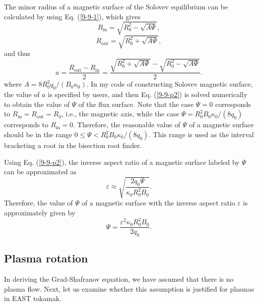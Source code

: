 \documentclass{article}
\newcommand{\tmop}[1]{\ensuremath{\operatorname{#1}}}
\begin{document}
The minor radius of a magnetic surface of the Solovev equilibrium can be
calculated by using Eq. (\ref{9-9-1}), which gives
\begin{equation}
  R_{\tmop{in}} = \sqrt{R_0^2 - \sqrt{A \Psi}},
\end{equation}
\begin{equation}
  R_{\tmop{out}} = \sqrt{R_0^2 + \sqrt{A \Psi}},
\end{equation}
and thus
\begin{equation}
  \label{9-9-p2} a = \frac{R_{\tmop{out}} - R_{\tmop{in}}}{2} =
  \frac{\sqrt{R_0^2 + \sqrt{A \Psi}} - \sqrt{R_0^2 - \sqrt{A \Psi}}}{2} .
\end{equation}
where $A = 8 R_0^2 q_0 / (B_0 \kappa_0)$. In my code of constructing Solovev
magnetic surface, the value of $a$ is specified by users, and then Eq.
(\ref{9-9-p2}) is solved numerically to obtain the value of $\Psi$ of the flux
surface. Note that the case $\Psi = 0$ corresponds to $R_{\tmop{in}} =
R_{\tmop{out}} = R_0$, i.e., the magnetic axis, while the case $\Psi = R_0^2
B_0 \kappa_0 / (8 q_0)$ corresponds to $R_{\tmop{in}} = 0$. Therefore, the
reasonable value of $\Psi$ of a magnetic surface should be in the range $0
\leqslant \Psi < R_0^2 B_0 \kappa_0 / (8 q_0)$. This range is used as the
interval bracketing a root in the bisection root finder.

Using Eq. (\ref{9-9-p2}), the inverse aspect ratio of a magnetic surface
labeled by $\Psi$ can be approximated as{\cite{jardin2010}}
\begin{equation}
  \varepsilon \approx \sqrt{\frac{2 q_0 \Psi}{\kappa_0 R_0^2 B_0}} .
\end{equation}
Therefore, the value of $\Psi$ of a magnetic surface with the inverse aspect
ratio $\varepsilon$ is approximately given by
\begin{equation}
  \Psi = \frac{\varepsilon^2 \kappa_0 R_0^2 B_0}{2 q_0} .
\end{equation}
\subsection{Plasma rotation}\label{20-4-7-p2}

In deriving the Grad-Shafranov equation, we have assumed that there is no
plasma flow. Next, let us examine whether this assumption is justified for
plasmas in EAST tokamak.
\end{document}
